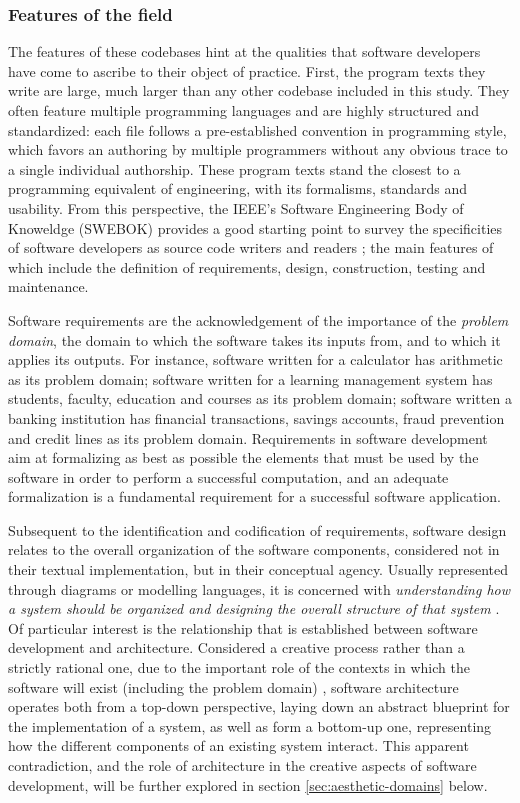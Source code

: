 \subsubsection{Features of the field}

The features of these codebases hint at the qualities that software developers have come to ascribe to their object of practice. First, the program texts they write are large, much larger than any other codebase included in this study. They often feature multiple programming languages and are highly structured and standardized: each file follows a pre-established convention in programming style, which favors an authoring by multiple programmers without any obvious trace to a single individual authorship. These program texts stand the closest to a programming equivalent of engineering, with its formalisms, standards and usability. From this perspective, the IEEE's Software Engineering Body of Knoweldge (SWEBOK) provides a good starting point to survey the specificities of software developers as source code writers and readers \citep{bourque_swebok_2014}; the main features of which include the definition of requirements, design, construction, testing and maintenance.

Software requirements are the acknowledgement of the importance of the \emph{problem domain}, the domain to which the software takes its inputs from, and to which it applies its outputs. For instance, software written for a calculator has arithmetic as its problem domain; software written for a learning management system has students, faculty, education and courses as its problem domain; software written a banking institution has financial transactions, savings accounts, fraud prevention and credit lines as its problem domain. Requirements in software development aim at formalizing as best as possible the elements that must be used by the software in order to perform a successful computation, and an adequate formalization is a fundamental requirement for a successful software application.

Subsequent to the identification and codification of requirements, software design relates to the overall organization of the software components, considered not in their textual implementation, but in their conceptual agency. Usually represented through diagrams or modelling languages, it is concerned with \emph{understanding how a system should be organized and designing the overall structure of that system} \citep{sommerville_software_2010}. Of particular interest is the relationship that is established between software development and architecture. Considered a creative process rather than a strictly rational one, due to the important role of the contexts in which the software will exist (including the problem domain) \citep{sommerville_software_2010}, software architecture operates both from a top-down perspective, laying down an abstract blueprint for the implementation of a system, as well as form a bottom-up one, representing how the different components of an existing system interact. This apparent contradiction, and the role of architecture in the creative aspects of software development, will be further explored in section \ref{sec:aesthetic-domains} below.

